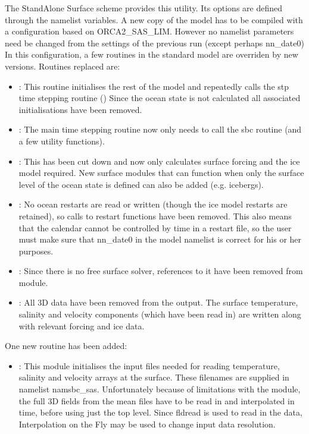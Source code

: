 \documentclass[../tex_main/NEMO_manual]{subfiles}
\begin{document}
The StandAlone Surface scheme provides this utility.
Its options are defined through the  namelist variables.
A new copy of the model has to be compiled with a configuration based on ORCA2\_SAS\_LIM.
However no namelist parameters need be changed from the settings of the previous run (except perhaps nn{\_}date0)
In this configuration, a few routines in the standard model are overriden by new versions.
Routines replaced are:

\begin{itemize}
\item {} : This routine initialises the rest of the model and repeatedly calls the stp time stepping routine ()
       Since the ocean state is not calculated all associated initialisations have been removed.
\item  {} : The main time stepping routine now only needs to call the sbc routine (and a few utility functions).
\item  {} : This has been cut down and now only calculates surface forcing and the ice model required.  New surface modules
       that can function when only the surface level of the ocean state is defined can also be added (e.g. icebergs).
\item  {} : No ocean restarts are read or written (though the ice model restarts are retained), so calls to restart functions
       have been removed.  This also means that the calendar cannot be controlled by time in a restart file, so the user
       must make sure that nn{\_}date0 in the model namelist is correct for his or her purposes.
\item  {} : Since there is no free surface solver, references to it have been removed from  module.
\item  {} : All 3D data have been removed from the output.  The surface temperature, salinity and velocity components (which
       have been read in) are written along with relevant forcing and ice data.
\end{itemize}

One new routine has been added:

\begin{itemize}
\item  {} : This module initialises the input files needed for reading temperature, salinity and velocity arrays at the surface.
       These filenames are supplied in namelist namsbc{\_}sas.  Unfortunately because of limitations with the  module,
       the full 3D fields from the mean files have to be read in and interpolated in time, before using just the top level.
       Since fldread is used to read in the data, Interpolation on the Fly may be used to change input data resolution.
\end{itemize}
\end{document}
